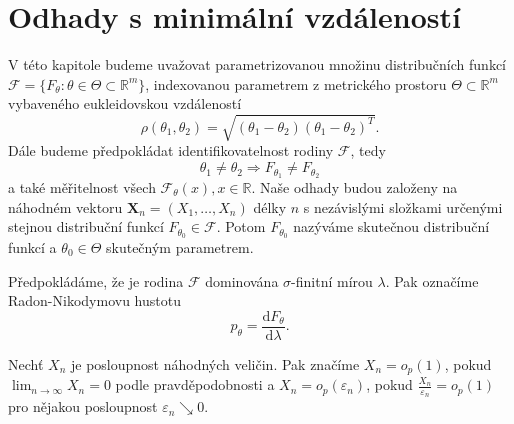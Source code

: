 \chapter{Odhady s minimální vzdáleností}

V této kapitole budeme uvažovat parametrizovanou množinu distribučních funkcí $\mathcal{F} = \lbrace F_\theta : \theta \in \Theta \subset \mathbb{R}^m \rbrace$, indexovanou parametrem z metrického prostoru $\Theta \subset \mathbb{R}^m$ vybaveného eukleidovskou vzdáleností 
\begin{equation}
	\rho (\theta_1,\theta_2) = \sqrt{(\theta_1-\theta_2)(\theta_1-\theta_2)^T}. 
\end{equation}
Dále budeme předpokládat identifikovatelnost rodiny $\mathcal{F}$, tedy 
\begin{equation}
\theta_1 \neq \theta_2 \Rightarrow F_{\theta_1} \neq F_{\theta_2}
\end{equation}
a také měřitelnost všech $\mathcal{F}_\theta(x), x \in \mathbb{R}$. Naše odhady budou založeny na náhodném vektoru $\mathbf{X}_n = (X_1, \ldots ,X_n)$ délky $n$ s nezávislými složkami určenými stejnou distribuční funkcí $F_{\theta_0} \in \mathcal{F}$. Potom $F_{\theta_0}$ nazýváme skutečnou distribuční funkcí a $\theta_0 \in \Theta$ skutečným parametrem. 

Předpokládáme, že je rodina $\mathcal{F}$ dominována $\sigma$-finitní mírou $\lambda$. Pak označíme Radon-Nikodymovu hustotu 
\begin{equation}
p_\theta = \dfrac{\mathrm{d} F_\theta}{\mathrm{d} \lambda}.
\end{equation}

\begin{definition}
	Nech\v{t} $X_n$ je posloupnost náhodných veličin. Pak značíme $X_n = o_p(1)$, pokud $\lim_{n \rightarrow \infty } X_n = 0$ podle pravděpodobnosti a $X_n = o_p(\varepsilon_n)$, pokud $\frac{X_n}{\varepsilon_n} = o_p(1)$ pro nějakou posloupnost $\varepsilon_n \searrow 0$.
\end{definition}

